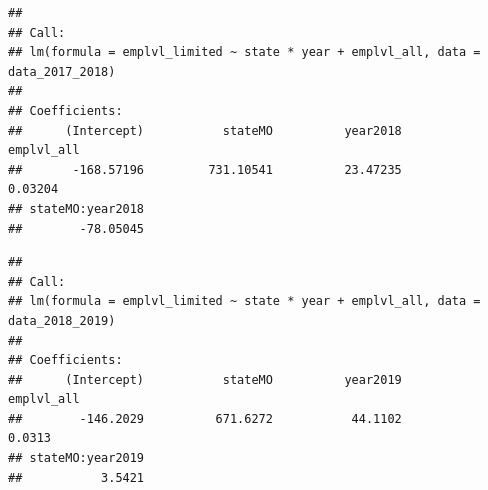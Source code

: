 \documentclass[
]{article}
\newenvironment{Shaded}{\begin{snugshade}}{\end{snugshade}}
\newcommand{\AttributeTok}[1]{\textcolor[rgb]{0.13,0.29,0.53}{#1}}
\newcommand{\CommentTok}[1]{\textcolor[rgb]{0.56,0.35,0.01}{\textit{#1}}}
\newcommand{\DecValTok}[1]{\textcolor[rgb]{0.00,0.00,0.81}{#1}}
\newcommand{\FloatTok}[1]{\textcolor[rgb]{0.00,0.00,0.81}{#1}}
\newcommand{\FunctionTok}[1]{\textcolor[rgb]{0.13,0.29,0.53}{\textbf{#1}}}
\newcommand{\NormalTok}[1]{#1}
\newcommand{\OtherTok}[1]{\textcolor[rgb]{0.56,0.35,0.01}{#1}}
\newcommand{\SpecialCharTok}[1]{\textcolor[rgb]{0.81,0.36,0.00}{\textbf{#1}}}
\begin{document}
\begin{verbatim}
## 
## Call:
## lm(formula = emplvl_limited ~ state * year + emplvl_all, data = data_2017_2018)
## 
## Coefficients:
##      (Intercept)           stateMO          year2018        emplvl_all  
##       -168.57196         731.10541          23.47235           0.03204  
## stateMO:year2018  
##        -78.05045
\end{verbatim}

\begin{Shaded}
\end{Shaded}

\begin{verbatim}
## 
## Call:
## lm(formula = emplvl_limited ~ state * year + emplvl_all, data = data_2018_2019)
## 
## Coefficients:
##      (Intercept)           stateMO          year2019        emplvl_all  
##        -146.2029          671.6272           44.1102            0.0313  
## stateMO:year2019  
##           3.5421
\end{verbatim}
\end{document}
